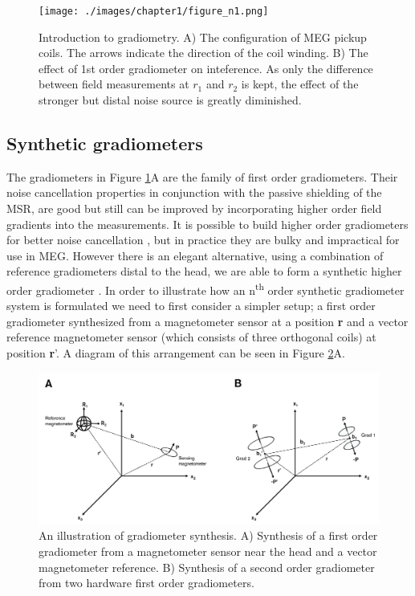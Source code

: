\begin{figure}[b!]
	\begin{center}
		\texttt{[image: ./images/chapter1/figure\_n1.png]}\caption{Introduction to gradiometry. A) The configuration of MEG pickup coils. The arrows indicate the direction of the coil winding. B) The effect of 1st order gradiometer on inteference. As only the difference between field measurements at $r_1$ and $r_2$ is kept, the effect of the stronger but distal noise source is greatly diminished.}\label{fig_1_n1}
	\end{center}
\end{figure}

\clearpage
\subsection{Synthetic gradiometers}
The gradiometers in Figure \ref{fig_1_n1}A are the family of first order gradiometers. Their noise cancellation properties in conjunction with the passive shielding of the MSR, are good but still can be improved by incorporating higher order field gradients into the measurements. It is possible to build higher order gradiometers for better noise cancellation \citep{Vrba1982}, but in practice they are bulky and impractical for use in MEG. However there is an elegant alternative, using a combination of reference gradiometers distal to the head, we are able to form a synthetic higher order gradiometer \citep{Vrba1991}. In order to illustrate how an n\textsuperscript{th} order synthetic gradiometer system is formulated we need to first consider a simpler setup; a first order gradiometer synthesized from a magnetometer sensor at a position \textbf{r} and a vector reference magnetometer sensor (which consists of three orthogonal coils) at position \textbf{r}'. A diagram of this arrangement can be seen in Figure \ref{fig_1_n2}A.

\begin{figure}[b!]
	\begin{center}
		\includegraphics[width=\linewidth]{./images/chapter1/figure_n2.pdf}\caption{An illustration of gradiometer synthesis. A) Synthesis of a first order gradiometer from a magnetometer sensor near the head and a vector magnetometer reference. B) Synthesis of a second order gradiometer from two hardware first order gradiometers.}\label{fig_1_n2}
	\end{center}
\end{figure}

